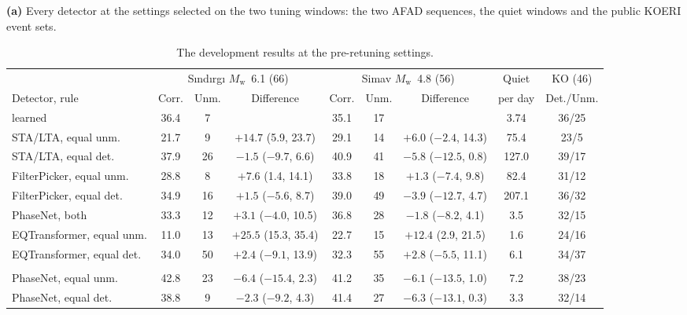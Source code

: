 \documentclass[11pt,a4paper]{article}
\newcommand{\Mw}{$M_\mathrm{w}$}
\newcommand{\stalta}{STA/LTA}
\newcommand{\panel}[1]{\par\smallskip\noindent\textbf{(#1)}\enskip}
\begin{document}
\begin{table}[htbp]
  \centering\footnotesize
  \caption{The development results at the pre-retuning settings.}\label{t:devresults}
  \panel{a} Every detector at the settings selected on the two tuning windows: the two
  AFAD sequences, the quiet windows and the public KOERI event sets.\par\smallskip
  \setlength{\tabcolsep}{2.6pt}
  \begin{tabular}{@{}lcccccccc@{}}
    \toprule
    & \multicolumn{3}{c}{S\i{}nd\i{}rg\i{} \Mw{}~6.1 (66)} & \multicolumn{3}{c}{Simav \Mw{}~4.8 (56)} & Quiet & KO (46) \\
    \cmidrule(lr){2-4}\cmidrule(lr){5-7}\cmidrule(lr){8-8}\cmidrule(lr){9-9}
    Detector, rule & Corr. & Unm. & Difference & Corr. & Unm. & Difference & per day & Det./Unm. \\
    \midrule
    learned                       & 36.4 & 7  &                       & 35.1 & 17 &                      & 3.74  & 36/25 \\
    \stalta{}, equal unm.         & 21.7 & 9  & $+14.7$ (5.9, 23.7)   & 29.1 & 14 & $+6.0$ ($-2.4$, 14.3) & 75.4  & 23/5 \\
    \stalta{}, equal det.         & 37.9 & 26 & $-1.5$ ($-9.7$, 6.6)  & 40.9 & 41 & $-5.8$ ($-12.5$, 0.8) & 127.0 & 39/17 \\
    FilterPicker, equal unm.      & 28.8 & 8  & $+7.6$ (1.4, 14.1)    & 33.8 & 18 & $+1.3$ ($-7.4$, 9.8)  & 82.4  & 31/12 \\
    FilterPicker, equal det.      & 34.9 & 16 & $+1.5$ ($-5.6$, 8.7)  & 39.0 & 49 & $-3.9$ ($-12.7$, 4.7) & 207.1 & 36/32 \\
    PhaseNet, both                & 33.3 & 12 & $+3.1$ ($-4.0$, 10.5) & 36.8 & 28 & $-1.8$ ($-8.2$, 4.1)  & 3.5   & 32/15 \\
    EQTransformer, equal unm.     & 11.0 & 13 & $+25.5$ (15.3, 35.4)  & 22.7 & 15 & $+12.4$ (2.9, 21.5)  & 1.6   & 24/16 \\
    EQTransformer, equal det.     & 34.0 & 50 & $+2.4$ ($-9.1$, 13.9) & 32.3 & 55 & $+2.8$ ($-5.5$, 11.1) & 6.1   & 34/37 \\
    \addlinespace
    \multicolumn{9}{@{}l}{\emph{Look-ahead, offline only}} \\
    PhaseNet, equal unm.          & 42.8 & 23 & $-6.4$ ($-15.4$, 2.3) & 41.2 & 35 & $-6.1$ ($-13.5$, 1.0) & 7.2   & 38/23 \\
    PhaseNet, equal det.          & 38.8 & 9  & $-2.3$ ($-9.2$, 4.3)  & 41.4 & 27 & $-6.3$ ($-13.1$, 0.3) & 3.3   & 32/14 \\

\end{tabular}
\end{table}
\end{document}
